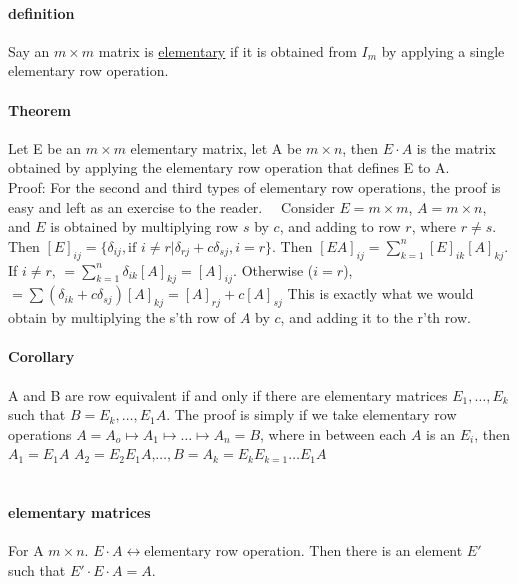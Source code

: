 \documentclass[10pt,letter]{article}
\begin{document}
\paragraph{definition}
Say an $m\times m$ matrix is \underline{elementary} if it is obtained from $I_m$ by applying a single elementary row operation. 

\paragraph{Theorem}
Let E be an $m\times m$ elementary matrix, let A be $m\times n$, then $E\cdot A$ is the matrix obtained by applying the elementary row operation that defines E to A. \\ 
Proof: For the second and third types of elementary row operations, the proof is easy and left as an exercise to the reader. \ \ 
Consider $E=m\times m$, $A=m\times n$, and $E$ is obtained by multiplying row $s$ by $c$, and adding to row $r$, where $r\neq s$. Then $[E]_{ij}=\{\delta_{ij}, \text{if }i\neq r| \delta_{rj}+c\delta_{sj}, i=r\}$. Then $[EA]_{ij}=\sum_{k=1}^n[E]_{ik}[A]_{kj}$. If $i\neq r$, $=\sum_{k=1}^n\delta_{ik}[A]_{kj}=[A]_{ij}$. Otherwise ($i=r$), $=\sum(\delta_{ik}+c\delta_{sj})[A]_{kj}=[A]_{rj}+c[A]_{sj}$ This is exactly what we would obtain by multiplying the s'th row of $A$ by $c$, and adding it to the r'th row. 

\paragraph{Corollary} 
A and B are row equivalent if and only if there are elementary matrices $E_1,\ldots,E_k$ such that $B=E_k,\ldots,E_1A$. The proof is simply if we take elementary row operations $A=A_o\mapsto A_1\mapsto\ldots\mapsto A_n=B$, where in between each $A$ is an $E_i$, then $A_1=E_1A$ $A_2=E_2E_1A$,$\ldots, B=A_k=E_kE_{k=1}\ldots E_1A$

\section*{}

\paragraph{elementary matrices}
For A $m\times n$. $E\cdot A\leftrightarrow$elementary row operation. Then there is an element $E'$ such that $E'\cdot E\cdot A=A$. \\ 
\end{document}
